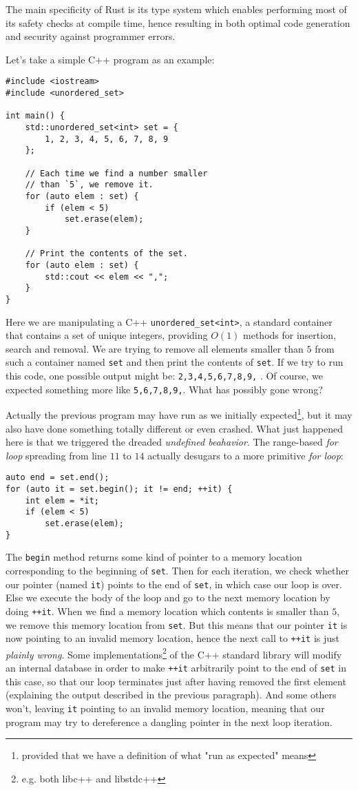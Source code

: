 \documentclass[twocolumn]{article}
\newcommand{\cpp}[1]{\texttt{#1}}
\newcommand{\mtext}[1]{\texttt{#1}}
\begin{document}
The main specificity of Rust is its type system which enables performing most of its safety checks at compile time, hence resulting in both optimal code generation and security against programmer errors.

Let's take a simple C++ program as an example:
\begin{verbatim}
#include <iostream>
#include <unordered_set>

int main() {
    std::unordered_set<int> set = {
        1, 2, 3, 4, 5, 6, 7, 8, 9
    };
    
    // Each time we find a number smaller
    // than `5`, we remove it.
    for (auto elem : set) {
        if (elem < 5)
            set.erase(elem);
    }
    
    // Print the contents of the set.
    for (auto elem : set) {
        std::cout << elem << ",";
    }
}
\end{verbatim}
Here we are manipulating a C++ \cpp{unordered_set<int>}, a standard container that contains a set of unique integers, providing $O(1)$ methods for insertion, search and removal. We are trying to remove all elements smaller than $5$ from such a container named \cpp{set} and then print the contents of \cpp{set}. If we try to run this code, one possible output might be: \mtext{2,3,4,5,6,7,8,9,} \cite{example1}. Of course, we expected something more like \mtext{5,6,7,8,9,}. What has possibly gone wrong?

Actually the previous program may have run as we initially expected\footnote{provided that we have a definition of what "run as expected" means}, but it may also have done something totally different or even crashed. What just happened here is that we triggered the dreaded \textit{undefined beahavior}. The range-based \textit{for loop} spreading from line $11$ to $14$ actually desugars to a more primitive \textit{for loop}:
\begin{verbatim}
auto end = set.end();
for (auto it = set.begin(); it != end; ++it) {
    int elem = *it;
    if (elem < 5)
        set.erase(elem);
}
\end{verbatim}
The \cpp{begin} method returns some kind of pointer to a memory location corresponding to the beginning of \cpp{set}. Then for each iteration, we check whether our pointer (named \cpp{it}) points to the end of \cpp{set}, in which case our loop is over. Else we execute the body of the loop and go to the next memory location by doing \cpp{++it}. When we find a memory location which contents is smaller than $5$, we remove this memory location from \cpp{set}. But this means that our pointer \cpp{it} is now pointing to an invalid memory location, hence the next call to \cpp{++it} is just \textit{plainly wrong}. Some implementations\footnote{e.g. both libc++ and libstdc++} of the C++ standard library will modify an internal database in order to make \cpp{++it} arbitrarily point to the end of \cpp{set} in this case, so that our loop terminates just after having removed the first element (explaining the output described in the previous paragraph). And some others won't, leaving \cpp{it} pointing to an invalid memory location, meaning that our program may try to dereference a dangling pointer in the next loop iteration.
\end{document}
